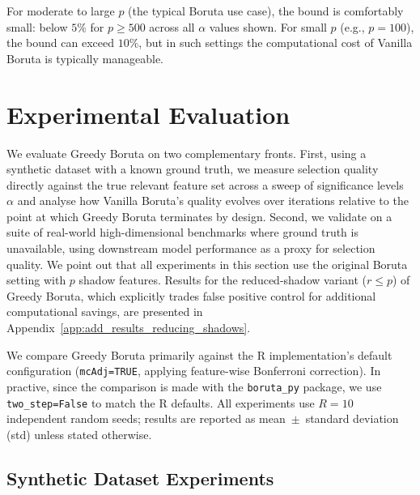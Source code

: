 \documentclass[runningheads]{llncs}
\begin{document}
For moderate to large $p$ (the typical Boruta use case), the bound is comfortably small: below $5\%$ for $p \geq 500$ across all $\alpha$ values shown. For small $p$ (e.g., $p = 100$), the bound can exceed $10\%$, but in such settings the computational cost of Vanilla Boruta is typically manageable.


\section{Experimental Evaluation}
\label{sec:experiments}
 
We evaluate Greedy Boruta on two complementary fronts. First, using a synthetic dataset with a known ground truth, we measure selection quality directly against the true relevant feature set across a sweep of significance levels~$\alpha$ and analyse how Vanilla Boruta's quality evolves over iterations relative to the point at which Greedy Boruta terminates by design. Second, we validate on a suite of real-world high-dimensional benchmarks where ground truth is
unavailable, using downstream model performance as a proxy for selection quality. We point out that all experiments in this section use the original Boruta setting with $p$ shadow features. Results for the reduced-shadow variant ($r \leq p$) of Greedy Boruta, which explicitly trades false positive control for additional computational savings, are presented in Appendix~\ref{app:add_results_reducing_shadows}.

We compare Greedy Boruta primarily against the R implementation's default configuration (\texttt{mcAdj=TRUE}, applying feature-wise Bonferroni correction). In practive, since the comparison is made with the \texttt{boruta\_py} package, we use \texttt{two\_step=False} to match the R defaults. All experiments use $R=10$ independent random seeds; results are reported as mean~$\pm$~standard deviation (std) unless stated otherwise.
 
\subsection{Synthetic Dataset Experiments}
\label{sec:experiments:setup}
 
\end{document}
